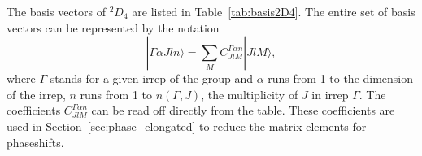 \documentclass[aps,prd,reprint,showpacs,floatfix,longbibliography,,superscriptaddress]{revtex4-1}
\def\beq{\begin{equation}}
\def\eeq{\end{equation}}
\begin{document}
\begin{widetext}
The basis vectors of $^2D_{4}$ are listed in Table~\ref{tab:basis2D4}.
The entire set of basis vectors can be represented by the notation
%
\beq
|\Gamma \alpha J l n\rangle = \sum_M C^{\Gamma \alpha n}_{J l M}  | Jl M  \rangle,
\eeq
%
where $\Gamma$ stands for a given irrep of the group and $\alpha$ runs from 1 to the dimension of the irrep, 
$n$ runs from 1 to $n(\Gamma,J)$, the multiplicity of $J$ in irrep $\Gamma$.
The coefficients $C^{\Gamma \alpha n}_{J l M}$ can be read off directly from the table.
These coefficients are used in Section~\ref{sec:phase_elongated} to reduce the matrix elements for phaseshifts.

%
\begin{table}
\end{table}
\end{widetext}
\end{document}

